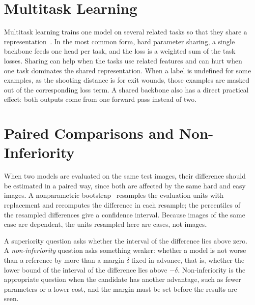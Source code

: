 \section{Multitask Learning}
\label{sec:mt_background}

Multitask learning trains one model on several related tasks so that they share a representation~\cite{caruana1997multitask,ruder2017overview}. In the most common form, hard parameter sharing, a single backbone feeds one head per task, and the loss is a weighted sum of the task losses. Sharing can help when the tasks use related features and can hurt when one task dominates the shared representation. When a label is undefined for some examples, as the shooting distance is for exit wounds, those examples are masked out of the corresponding loss term. A shared backbone also has a direct practical effect: both outputs come from one forward pass instead of two.

\section{Paired Comparisons and Non-Inferiority}
\label{sec:stats_background}

When two models are evaluated on the same test images, their difference should be estimated in a paired way, since both are affected by the same hard and easy images. A nonparametric bootstrap~\cite{efron1993bootstrap} resamples the evaluation units with replacement and recomputes the difference in each resample; the percentiles of the resampled differences give a confidence interval. Because images of the same case are dependent, the units resampled here are cases, not images.

A superiority question asks whether the interval of the difference lies above zero. A \emph{non-inferiority} question asks something weaker: whether a model is not worse than a reference by more than a margin $\delta$ fixed in advance, that is, whether the lower bound of the interval of the difference lies above $-\delta$. Non-inferiority is the appropriate question when the candidate has another advantage, such as fewer parameters or a lower cost, and the margin must be set before the results are seen.
